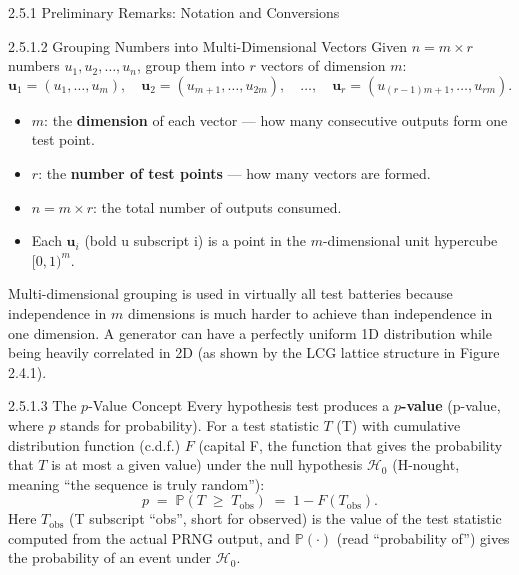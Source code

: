 \documentclass[aspectratio=169,10pt]{beamer}
\begin{document}
\begin{frame}[allowframebreaks]{2.5.1 Preliminary Remarks: Notation and Conversions}
\framebreak

\begin{block}{2.5.1.2 Grouping Numbers into Multi-Dimensional Vectors}
Given $n = m \times r$ numbers $u_1, u_2, \ldots, u_n$, group them into $r$
vectors of dimension $m$:
\[
  \mathbf{u}_1 = (u_1, \ldots, u_m),\quad
  \mathbf{u}_2 = (u_{m+1}, \ldots, u_{2m}),\quad
  \ldots,\quad
  \mathbf{u}_r = (u_{(r-1)m+1}, \ldots, u_{rm}).
\]

\begin{itemize}
  \item $m$: the \textbf{dimension} of each vector --- how many consecutive
    outputs form one test point.
  \item $r$: the \textbf{number of test points} --- how many vectors are formed.
  \item $n = m \times r$: the total number of outputs consumed.
  \item Each $\mathbf{u}_i$ (bold u subscript i) is a point in the
    $m$-dimensional unit hypercube $[0,1)^m$.
\end{itemize}

Multi-dimensional grouping is used in virtually all test batteries because
independence in $m$ dimensions is much harder to achieve than independence
in one dimension.  A generator can have a perfectly uniform 1D distribution
while being heavily correlated in 2D (as shown by the LCG lattice structure
in Figure 2.4.1).
\end{block}

\begin{block}{2.5.1.3 The $p$-Value Concept}
Every hypothesis test produces a \textbf{$p$-value} (p-value, where $p$
stands for probability).  For a test statistic $T$ (T) with cumulative
distribution function (c.d.f.) $F$ (capital F, the function that gives
the probability that $T$ is at most a given value) under the null hypothesis
$\mathcal{H}_0$ (H-nought, meaning ``the sequence is truly random''):
\[
  p \;=\; \mathbb{P}(T \;\ge\; T_{\mathrm{obs}}) \;=\; 1 - F(T_{\mathrm{obs}}).
\]
Here $T_{\mathrm{obs}}$ (T subscript ``obs'', short for observed) is the
value of the test statistic computed from the actual PRNG output, and
$\mathbb{P}(\cdot)$ (read ``probability of'') gives the probability of an
event under $\mathcal{H}_0$.


\end{block}
\end{frame}
\end{document}
